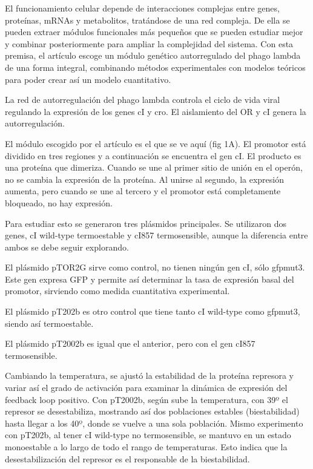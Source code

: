 El funcionamiento celular depende de interacciones complejas entre genes, proteínas, mRNAs y metabolitos, tratándose de una red compleja. De ella se pueden extraer módulos funcionales más pequeños que se pueden estudiar mejor y combinar posteriormente para ampliar la complejidad del sistema. 
Con esta premisa, el artículo escoge un módulo genético autorregulado del phago lambda de una forma integral, combinando métodos experimentales con modelos teóricos para poder crear así un modelo cuantitativo.

La red de autorregulación del phago lambda controla el ciclo de vida viral regulando la expresión de los genes cI y cro. El aislamiento del OR y cI genera la autorregulación.

El módulo escogido por el artículo es el que se ve aquí (fig 1A). El promotor está dividido en tres regiones y a continuación se encuentra el gen cI. El producto es una proteína que dimeriza. Cuando se une al primer sitio de unión en el operón, no se cambia la expresión de la proteína. Al unirse al segundo, la expresión aumenta, pero cuando se une al tercero y el promotor está completamente bloqueado, no hay expresión.

Para estudiar esto se generaron tres plásmidos principales. Se utilizaron dos genes, cI wild-type termoestable y cI857 termosensible, aunque la diferencia entre ambos se debe seguir explorando.

El plásmido pTOR2G sirve como control, no tienen ningún gen cI, sólo gfpmut3. Este gen expresa GFP y permite así determinar la tasa de expresión basal del promotor, sirviendo como medida cuantitativa experimental.

El plásmido pT202b es otro control que tiene tanto cI wild-type como gfpmut3, siendo así termoestable. 

El plásmido pT2002b es igual que el anterior, pero con el gen cI857 termosensible.


Cambiando la temperatura, se ajustó la estabilidad de la proteína represora y variar así el grado de activación para examinar la dinámica de expresión del feedback loop positivo. 
Con pT2002b, según sube la temperatura, con 39º el represor se desestabiliza, mostrando así dos poblaciones estables (biestabilidad) hasta llegar a los 40º, donde se vuelve a una sola población.
Mismo experimento con pT202b, al tener cI wild-type no termosensible, se mantuvo en un estado monoestable a lo largo de todo el rango de temperaturas. Esto indica que la desestabilización del represor es el responsable de la biestabilidad. 



